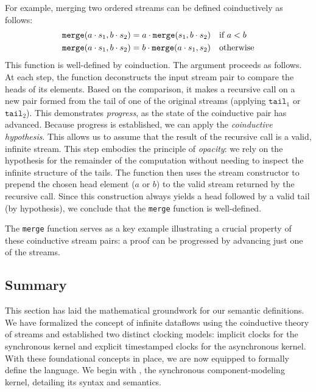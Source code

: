 For example, merging two ordered streams can be defined coinductively as follows:
%
\begin{align*}
    \texttt{merge}(a \cdot s_1, b \cdot s_2) & = a \cdot \texttt{merge}(s_1, b \cdot s_2) &
                                             & \text{if } a < b                             \\
    \texttt{merge}(a \cdot s_1, b \cdot s_2) & = b \cdot \texttt{merge}(a \cdot s_1, s_2) &
                                             & \text{otherwise}
\end{align*}
%
This function is well-defined by coinduction. The argument proceeds as follows. At each step, the
function deconstructs the input stream pair to compare the heads of its elements. Based on the
comparison, it makes a recursive call on a new pair formed from the tail of one of the original
streams (applying $\texttt{tail}_1$ or $\texttt{tail}_2$). This demonstrates \emph{progress}, as the
state of the coinductive pair has advanced.
%
Because progress is established, we can apply the \emph{coinductive hypothesis}. This allows us to
assume that the result of the recursive call is a valid, infinite stream. This step embodies the
principle of \emph{opacity}: we rely on the hypothesis for the remainder of the computation without
needing to inspect the infinite structure of the tails.
%
The function then uses the stream constructor to prepend the chosen head element ($a$ or $b$) to the
valid stream returned by the recursive call. Since this construction always yields a head followed
by a valid tail (by hypothesis), we conclude that the \texttt{merge} function is well-defined.

The \texttt{merge} function serves as a key example illustrating a crucial property of these
coinductive stream pairs: a proof can be progressed by advancing just one of the streams.

\subsection{Summary}
This section has laid the mathematical groundwork for our semantic definitions. We have formalized
the concept of infinite dataflows using the coinductive theory of streams and established two
distinct clocking models: implicit clocks for the synchronous \GRSync kernel and explicit
timestamped clocks for the asynchronous \GRFRP kernel. With these foundational concepts in place, we
are now equipped to formally define the \GRust language. We begin with \GRSync, the synchronous
component-modeling kernel, detailing its syntax and semantics.
